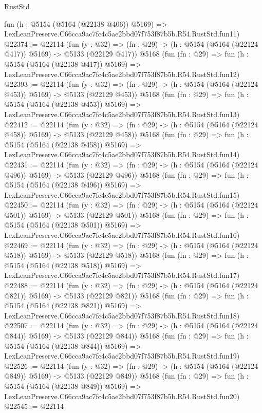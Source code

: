 \begin{lexlean}{RustStd}
\begin{coremodule}
    fun (h : @5154 (@5164 (@22138 @406)) @5169) =>
    LexLeanPreserve.C66cca9ac7fc4c5ae2bbd07f753f87b5b.R54.RustStd.fun11)
@22374 := @22114
    (fun (y : @32) => (fn : @29) -> (h : @5154 (@5164 (@22124 @417)) @5169) -> @5133 (@22129 @417))
    @5168
    (fun (fn : @29) =>
    fun (h : @5154 (@5164 (@22138 @417)) @5169) =>
    LexLeanPreserve.C66cca9ac7fc4c5ae2bbd07f753f87b5b.R54.RustStd.fun12)
@22393 := @22114
    (fun (y : @32) => (fn : @29) -> (h : @5154 (@5164 (@22124 @453)) @5169) -> @5133 (@22129 @453))
    @5168
    (fun (fn : @29) =>
    fun (h : @5154 (@5164 (@22138 @453)) @5169) =>
    LexLeanPreserve.C66cca9ac7fc4c5ae2bbd07f753f87b5b.R54.RustStd.fun13)
@22412 := @22114
    (fun (y : @32) => (fn : @29) -> (h : @5154 (@5164 (@22124 @458)) @5169) -> @5133 (@22129 @458))
    @5168
    (fun (fn : @29) =>
    fun (h : @5154 (@5164 (@22138 @458)) @5169) =>
    LexLeanPreserve.C66cca9ac7fc4c5ae2bbd07f753f87b5b.R54.RustStd.fun14)
@22431 := @22114
    (fun (y : @32) => (fn : @29) -> (h : @5154 (@5164 (@22124 @496)) @5169) -> @5133 (@22129 @496))
    @5168
    (fun (fn : @29) =>
    fun (h : @5154 (@5164 (@22138 @496)) @5169) =>
    LexLeanPreserve.C66cca9ac7fc4c5ae2bbd07f753f87b5b.R54.RustStd.fun15)
@22450 := @22114
    (fun (y : @32) => (fn : @29) -> (h : @5154 (@5164 (@22124 @501)) @5169) -> @5133 (@22129 @501))
    @5168
    (fun (fn : @29) =>
    fun (h : @5154 (@5164 (@22138 @501)) @5169) =>
    LexLeanPreserve.C66cca9ac7fc4c5ae2bbd07f753f87b5b.R54.RustStd.fun16)
@22469 := @22114
    (fun (y : @32) => (fn : @29) -> (h : @5154 (@5164 (@22124 @518)) @5169) -> @5133 (@22129 @518))
    @5168
    (fun (fn : @29) =>
    fun (h : @5154 (@5164 (@22138 @518)) @5169) =>
    LexLeanPreserve.C66cca9ac7fc4c5ae2bbd07f753f87b5b.R54.RustStd.fun17)
@22488 := @22114
    (fun (y : @32) => (fn : @29) -> (h : @5154 (@5164 (@22124 @821)) @5169) -> @5133 (@22129 @821))
    @5168
    (fun (fn : @29) =>
    fun (h : @5154 (@5164 (@22138 @821)) @5169) =>
    LexLeanPreserve.C66cca9ac7fc4c5ae2bbd07f753f87b5b.R54.RustStd.fun18)
@22507 := @22114
    (fun (y : @32) => (fn : @29) -> (h : @5154 (@5164 (@22124 @844)) @5169) -> @5133 (@22129 @844))
    @5168
    (fun (fn : @29) =>
    fun (h : @5154 (@5164 (@22138 @844)) @5169) =>
    LexLeanPreserve.C66cca9ac7fc4c5ae2bbd07f753f87b5b.R54.RustStd.fun19)
@22526 := @22114
    (fun (y : @32) => (fn : @29) -> (h : @5154 (@5164 (@22124 @849)) @5169) -> @5133 (@22129 @849))
    @5168
    (fun (fn : @29) =>
    fun (h : @5154 (@5164 (@22138 @849)) @5169) =>
    LexLeanPreserve.C66cca9ac7fc4c5ae2bbd07f753f87b5b.R54.RustStd.fun20)
@22545 := @22114

\end{coremodule}
\end{lexlean}
